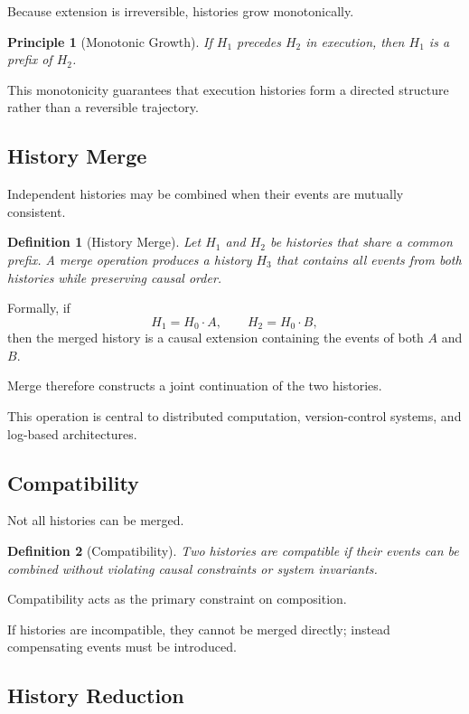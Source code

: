 \documentclass[12pt]{article}
\newtheorem{definition}{Definition}
\newtheorem{principle}{Principle}
\begin{document}
Because extension is irreversible, histories grow monotonically.

\begin{principle}[Monotonic Growth]
If $H_1$ precedes $H_2$ in execution, then $H_1$ is a prefix
of $H_2$.
\end{principle}

This monotonicity guarantees that execution histories
form a directed structure rather than a reversible trajectory.

\subsection{History Merge}

Independent histories may be combined when their events
are mutually consistent.

\begin{definition}[History Merge]
Let $H_1$ and $H_2$ be histories that share a common prefix.
A merge operation produces a history $H_3$ that contains
all events from both histories while preserving causal order.
\end{definition}

Formally, if
\[
H_1 = H_0 \cdot A,
\qquad
H_2 = H_0 \cdot B,
\]
then the merged history is a causal extension containing
the events of both $A$ and $B$.

Merge therefore constructs a joint continuation of the
two histories.

This operation is central to distributed computation,
version-control systems, and log-based architectures.

\subsection{Compatibility}

Not all histories can be merged.

\begin{definition}[Compatibility]
Two histories are compatible if their events can be combined
without violating causal constraints or system invariants.
\end{definition}

Compatibility acts as the primary constraint on composition.

If histories are incompatible, they cannot be merged directly;
instead compensating events must be introduced.

\subsection{History Reduction}
\end{document}

